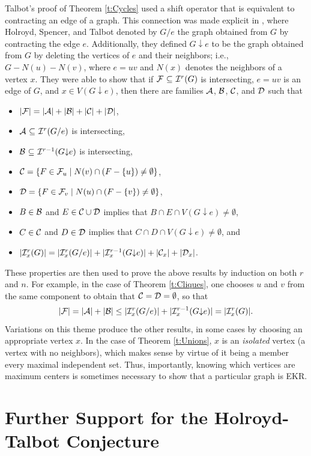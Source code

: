 \documentclass{article}
\def\cA{{\cal A}}
\def\cB{{\cal B}}
\def\cC{{\cal C}}
\def\cD{{\cal D}}
\def\cF{{\cal F}}
\def\cI{{\cal I}}
\def\ekr{{\sf EKR}}
\def\da{{\downarrow}}
\def\mt{{\emptyset}}
\def\sse{{\subseteq}}
\begin{document}
Talbot's proof of Theorem \ref{t:Cycles} used a shift operator that is equivalent to contracting an edge of a graph.
This connection was made explicit in \cite{HolSpeTal}, where Holroyd, Spencer, and Talbot denoted by $G/e$ the graph obtained from $G$ by contracting the edge $e$.
Additionally, they defined $G\da e$ to be the graph obtained from $G$ by deleting the vertices of $e$ and their neighbors; i.e., $G-N(u)-N(v)$, where $e=uv$ and $N(x)$ denotes the neighbors of a vertex $x$.
They were able to show that if $\cF\ \sse\ \cI^r(G)$ is intersecting, $e=uv$ is an edge of $G$, and $x\in V(G\da e)$, then there are families $\cA$, $\cB$, $\cC$, and $\cD$ such that
\begin{itemize}
    \item 
    $|\cF|=|\cA|+|\cB|+|\cC|+|\cD|$,
    \item 
    $\cA\ \sse\ \cI^r(G/e)$ is intersecting,
    \item 
    $\cB\ \sse\ \cI^{r-1}(G\da e)$ is intersecting,
    \item 
    $\cC=\{F\in\cF_u\mid N(v)\cap (F-\{u\})\not=\mt\}$,
    \item 
    $\cD=\{F\in\cF_v\mid N(u)\cap (F-\{v\})\not=\mt\}$,
    \item 
    $B\in\cB$ and $E\in\cC\cup\cD$ implies that $B\cap E\cap V(G\da e)\not=\mt$,
    \item 
    $C\in\cC$ and $D\in\cD$ implies that $C\cap D\cap V(G\da e)\not=\mt$, and
    \item 
    $|\cI^r_x(G)| = |\cI^r_x(G/e)| + |\cI^{r-1}_x(G\da e)| + |\cC_x| + |\cD_x|$.
\end{itemize}
These properties are then used to prove the above results by induction on both $r$ and $n$.
For example, in the case of Theorem \ref{t:Cliques}, one chooses $u$ and $v$ from the same component to obtain that $\cC=\cD=\mt$, so that
\[
|\cF| = |\cA|+|\cB| \le |\cI^r_x(G/e)|+|\cI^{r-1}_x(G\da e)| = |\cI^r_x(G)|.
\]
Variations on this theme produce the other results, in some cases by choosing an appropriate vertex $x$.
In the case of Theorem \ref{t:Unions}, $x$ is an {\it isolated} vertex (a vertex with no neighbors), which makes sense by virtue of it being a member every maximal independent set.
Thus, importantly, knowing which vertices are maximum centers is sometimes necessary to show that a particular graph is \ekr.



\section{Further Support for the Holroyd-Talbot Conjecture}
\label{s:Support}
\end{document}
